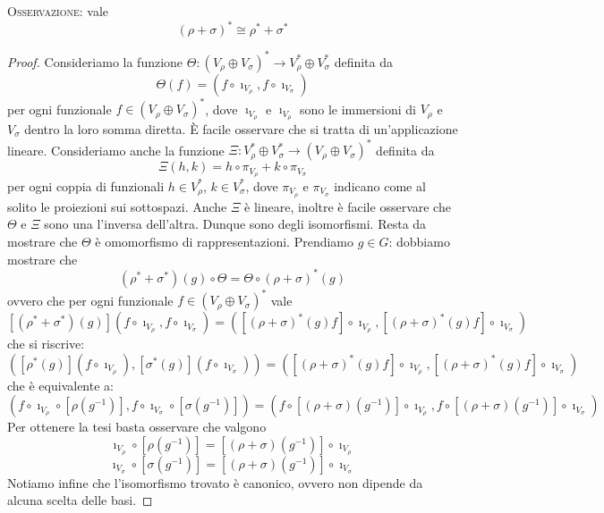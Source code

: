 \documentclass[11pt]{article}
\theoremstyle{plain}
\theoremstyle{definition}
\theoremstyle{remark}
\begin{document}
\textsc{Osservazione:} vale
\[ (\rho + \sigma)^* \cong \rho^* + \sigma^* \]
\begin{proof}
Consideriamo la funzione $\Theta : (V_\rho \oplus V_\sigma)^*\to V_\rho ^* \oplus V_\sigma ^*$ definita da
\[ \Theta(f) = (f\circ \imath_{V_\rho}, f\circ \imath_{V_\sigma}) \]
per ogni funzionale $f\in (V_\rho \oplus V_\sigma)^*$, dove $\imath_{V_\rho}$ e $\imath_{V_\rho}$ sono le immersioni di $V_\rho$ e $V_\sigma$ dentro la loro somma diretta.
\`E facile osservare che si tratta di un'applicazione lineare. Consideriamo anche
la funzione $\Xi: V_\rho ^* \oplus V_\sigma ^* \to (V_\rho \oplus V_\sigma)^*$ definita da
\[ \Xi(h,k) = h\circ\pi_{V_\rho} + k\circ\pi_{V_\sigma} \]
per ogni coppia di funzionali $h\in V_\rho ^*$, $k\in V_\sigma ^*$,
dove $\pi_{V_\rho}$ e $\pi_{V_\sigma}$ indicano come al solito le proiezioni sui sottospazi. 
Anche $\Xi$ è lineare, inoltre è facile osservare che $\Theta$ e $\Xi$ sono una l'inversa dell'altra. Dunque sono degli 
isomorfismi. Resta da mostrare che $\Theta$ è omomorfismo di rappresentazioni. Prendiamo $g\in G$: dobbiamo mostrare che 
\[ (\rho^*+\sigma^*)(g) \circ \Theta = \Theta \circ (\rho + \sigma)^*(g) \]
ovvero che per ogni funzionale $f\in (V_\rho \oplus V_\sigma)^*$ vale
\[ [(\rho^*+\sigma^*)(g)] (f\circ \imath_{V_\rho}, f\circ \imath_{V_\sigma}) = ([(\rho + \sigma)^*(g)f]\circ \imath_{V_\rho}, [(\rho + \sigma)^*(g)f]\circ \imath_{V_\sigma}) \]
che si riscrive:
\[ ([\rho^*(g)](f\circ \imath_{V_\rho}), [\sigma^*(g)](f\circ \imath_{V_\sigma})) = ([(\rho + \sigma)^*(g)f]\circ \imath_{V_\rho}, [(\rho + \sigma)^*(g)f]\circ \imath_{V_\sigma}) \]
che è equivalente a:
\[ (f\circ \imath_{V_\rho} \circ [\rho(g^{-1})], f\circ \imath_{V_\sigma}\circ[\sigma(g^{-1})]) = (f\circ [(\rho+\sigma)(g^{-1})] \circ \imath_{V_\rho} , f\circ[(\rho+\sigma)(g^{-1})]\circ \imath_{V_\sigma}) \]
Per ottenere la tesi basta osservare che valgono
\[ \imath_{V_\rho} \circ [\rho(g^{-1})] = [(\rho+\sigma)(g^{-1})] \circ \imath_{V_\rho}\]
\[\imath_{V_\sigma} \circ [\sigma(g^{-1})] = [(\rho+\sigma)(g^{-1})] \circ \imath_{V_\sigma}\]
Notiamo infine che l'isomorfismo trovato è canonico, ovvero non dipende da alcuna scelta delle basi.
\end{proof}
\end{document}
